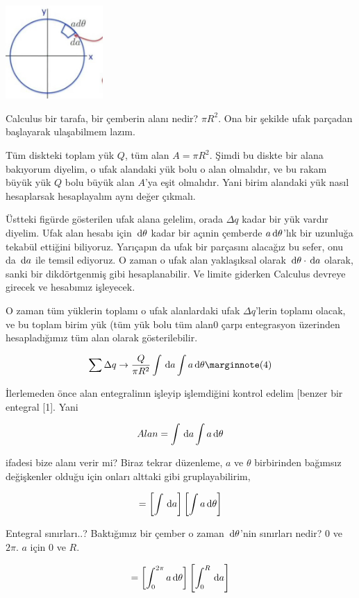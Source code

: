 \documentclass[12pt,fleqn]{article}\usepackage{../../common}
\begin{document}
\includegraphics[width=10em]{06_09.jpg}

Calculus bir tarafa, bir çemberin alanı nedir? $\pi R^2$. Ona bir şekilde ufak
parçadan başlayarak ulaşabilmem lazım. 

Tüm diskteki toplam yük $Q$, tüm alan $A = \pi R^2$. Şimdi bu diskte bir alana
bakıyorum diyelim, o ufak alandaki yük bolu o alan olmalıdır, ve bu rakam büyük
yük $Q$ bolu büyük alan $A$'ya eşit olmalıdır. Yani birim alandaki yük nasıl
hesaplarsak hesaplayalım aynı değer çıkmalı.

Üstteki figürde gösterilen ufak alana gelelim, orada $\Delta q$ kadar bir yük
vardır diyelim. Ufak alan hesabı için $\,\mathrm{d} \theta$ kadar bir açınin çemberde $a
\,\mathrm{d} \theta$'lık bir uzunluğa tekabül ettiğini biliyoruz. Yarıçapın da ufak bir
parçasını alacağız bu sefer, onu da $\,\mathrm{d} a$ ile temsil ediyoruz. O zaman o ufak
alan yaklaşıksal olarak $\,\mathrm{d} \theta \cdot \,\mathrm{d} a$ olarak, sanki bir dikdörtgenmiş
gibi hesaplanabilir. Ve limite giderken Calculus devreye girecek ve hesabımız
işleyecek. 

O zaman tüm yüklerin toplamı o ufak alanlardaki ufak $\Delta q$'lerin toplamı
olacak, ve bu toplam birim yük (tüm yük bolu tüm alan0 çarpı entegrasyon
üzerinden hesapladığımız tüm alan olarak gösterilebilir.

$$
\sum \Delta q \to \frac{Q}{\pi R^2} \int \ud a \int a \ud\theta \mlabel{4}
$$

İlerlemeden önce alan entegralinın işleyip işlemdiğini kontrol edelim [benzer
 bir entegral [1]. Yani

$$
Alan = \int \,\mathrm{d} a \int a \,\mathrm{d} \theta
$$

ifadesi bize alanı verir mi? Biraz tekrar düzenleme, $a$ ve $\theta$ birbirinden
bağımsız değişkenler olduğu için onları alttaki gibi gruplayabilirim,

$$
= \left[ \int \,\mathrm{d} a \right] \left[ \int a \,\mathrm{d} \theta \right]
$$

Entegral sınırları..? Baktığımız bir çember o zaman $\,\mathrm{d} \theta$'nin sınırları
nedir? 0 ve $2\pi$. $a$ için 0 ve $R$.

$$
=  \left[ \int_{0}^{2\pi} a \,\mathrm{d} \theta \right] \left[ \int_{0}^{R} \,\mathrm{d} a \right]
$$
\end{document}
